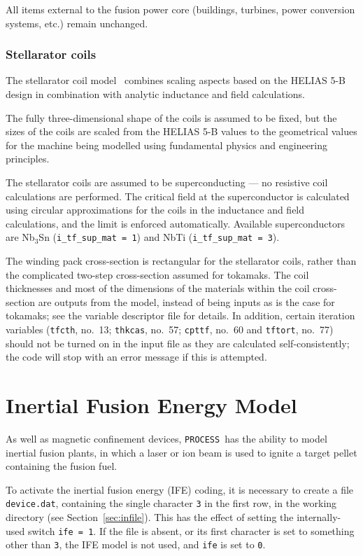 \documentclass[11pt,a4paper]{report}
\newcommand{\process}{\mbox{\texttt{PROCESS}}}
\begin{document}
All items external to the fusion power core (buildings, turbines, power
conversion systems, etc.) remain unchanged.

\subsubsection{Stellarator coils}

The stellarator coil model~\cite{stell_coil, stell_coil2} combines scaling
aspects based on the HELIAS 5-B design in combination with analytic inductance
and field calculations.

The fully three-dimensional shape of the coils is assumed to be fixed, but the
sizes of the coils are scaled from the HELIAS 5-B values to the geometrical
values for the machine being modelled using fundamental physics and
engineering principles.

The stellarator coils are assumed to be superconducting --- no resistive coil
calculations are performed.  The critical field at the superconductor is
calculated using circular approximations for the coils in the inductance and
field calculations, and the limit is enforced automatically. Available
superconductors are Nb$_3$Sn (\texttt{i\_tf\_sup\_mat = 1}) and NbTi
(\texttt{i\_tf\_sup\_mat = 3}).

The winding pack cross-section is rectangular for the stellarator coils,
rather than the complicated two-step cross-section assumed for tokamaks. The
coil thicknesses and most of the dimensions of the materials within the coil
cross-section are outputs from the model, instead of being inputs as is the
case for tokamaks; see the variable descriptor file for details. In addition,
certain iteration variables (\texttt{tfcth}, no.\ 13; \texttt{thkcas}, no.\
57; \texttt{cpttf}, no.\ 60 and \texttt{tftort}, no.\ 77) should not be turned
on in the input file as they are calculated self-consistently; the code will
stop with an error message if this is attempted.

\section{Inertial Fusion Energy Model}
\label{sec:ife}

As well as magnetic confinement devices, \process\ has the ability to model
inertial fusion plants, in which a laser or ion beam is used to ignite a
target pellet containing the fusion fuel.

To activate the inertial fusion energy (IFE) coding, it is necessary to create
a file \texttt{device.dat}, containing the single character \texttt{3} in the
first row, in the working directory (see Section~\ref{sec:infile}). This has
the effect of setting the internally-used switch \texttt{ife = 1}. If the file
is absent, or its first character is set to something other than \texttt{3},
the IFE model is not used, and \texttt{ife} is set to \texttt{0}.
\end{document}
